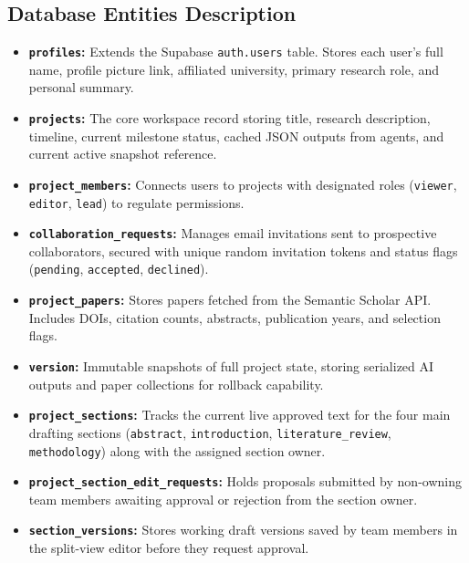 \documentclass[11pt,a4paper]{article}
\begin{document}
\subsection{Database Entities Description}
\begin{itemize}
    \item \textbf{\texttt{profiles}:} Extends the Supabase \texttt{auth.users} table. Stores each user's full name, profile picture link, affiliated university, primary research role, and personal summary.
    \item \textbf{\texttt{projects}:} The core workspace record storing title, research description, timeline, current milestone status, cached JSON outputs from agents, and current active snapshot reference.
    \item \textbf{\texttt{project\_members}:} Connects users to projects with designated roles (\texttt{viewer}, \texttt{editor}, \texttt{lead}) to regulate permissions.
    \item \textbf{\texttt{collaboration\_requests}:} Manages email invitations sent to prospective collaborators, secured with unique random invitation tokens and status flags (\texttt{pending}, \texttt{accepted}, \texttt{declined}).
    \item \textbf{\texttt{project\_papers}:} Stores papers fetched from the Semantic Scholar API. Includes DOIs, citation counts, abstracts, publication years, and selection flags.
    \item \textbf{\texttt{version}:} Immutable snapshots of full project state, storing serialized AI outputs and paper collections for rollback capability.
    \item \textbf{\texttt{project\_sections}:} Tracks the current live approved text for the four main drafting sections (\texttt{abstract}, \texttt{introduction}, \texttt{literature\_review}, \texttt{methodology}) along with the assigned section owner.
    \item \textbf{\texttt{project\_section\_edit\_requests}:} Holds proposals submitted by non-owning team members awaiting approval or rejection from the section owner.
    \item \textbf{\texttt{section\_versions}:} Stores working draft versions saved by team members in the split-view editor before they request approval.
\end{itemize}

\clearpage
\end{document}
